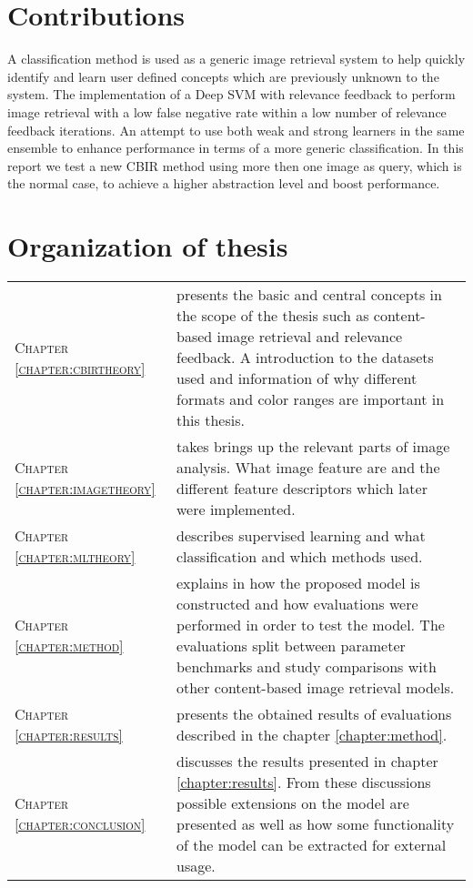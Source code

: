 \section{Contributions}

A classification method is used as a generic image retrieval system to help quickly identify and learn user defined concepts which are previously unknown to the system. 
The implementation of a Deep SVM with relevance feedback to perform image retrieval with a low false negative rate within a low number of relevance feedback iterations. 
An attempt to use both weak and strong learners in the same ensemble to enhance performance in terms of a more generic classification. In this report we test a new CBIR method using more then one image as query, which is the normal case, to achieve a higher abstraction level and boost performance. 

\section{Organization of thesis}

\begin{tabular}{l p{}}
\textsc{Chapter \ref{chapter:cbirtheory}} & \textbf{\nameref{chapter:cbirtheory}} 
presents the basic and central concepts in the scope of the thesis such as content-based image retrieval and relevance feedback. A introduction to the datasets used and information of why different formats and color ranges are important in this thesis.\\ 
\textsc{Chapter \ref{chapter:imagetheory}} & \textbf{\nameref{chapter:imagetheory}}
takes brings up the relevant parts of image analysis. What image feature are and the different feature descriptors which later were implemented.\\ 
\textsc{Chapter \ref{chapter:mltheory}} & \textbf{\nameref{chapter:mltheory}}
describes supervised learning and what classification and which methods used. \\ 
\textsc{Chapter \ref{chapter:method}} & \textbf{\nameref{chapter:method}}
explains in how the proposed model is constructed and how evaluations were performed in order to test the model. The evaluations split between parameter benchmarks and study comparisons with other content-based image retrieval models.\\ 
\textsc{Chapter \ref{chapter:results}} & \textbf{\nameref{chapter:results}}
presents the obtained results of evaluations described in the chapter \ref{chapter:method}. \\ 
\textsc{Chapter \ref{chapter:conclusion}} & \textbf{\nameref{chapter:conclusion}}
discusses the results presented in chapter \ref{chapter:results}. From these discussions possible extensions on the model are presented as well as how some functionality of the model can be extracted for external usage. \\ 
\end{tabular}

